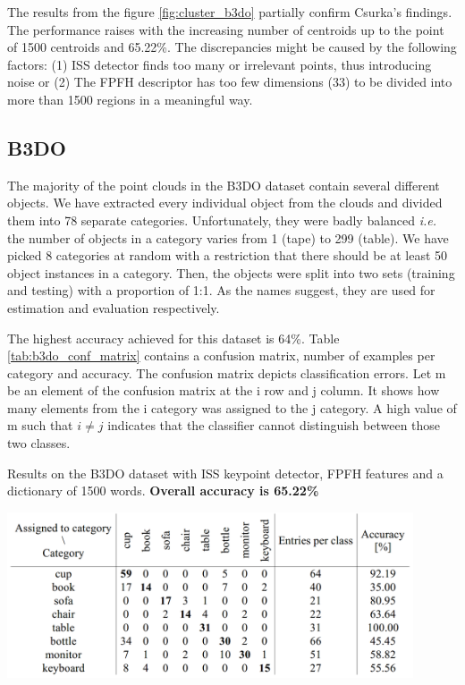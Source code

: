 	The results from the figure \ref{fig:cluster_b3do} partially confirm Csurka's findings. The performance raises with the increasing number of centroids up to the point of 1500 centroids and 65.22\%. The discrepancies might be caused by the following factors: (1) ISS detector finds too many or irrelevant points, thus introducing noise or (2) The FPFH descriptor has too few dimensions (33) to be divided into more than 1500 regions in a meaningful way. 

	
	\subsection{B3DO}
	The majority of the point clouds in the B3DO dataset contain several different objects. We have extracted every individual object from the clouds and divided them into 78 separate categories. Unfortunately, they were badly balanced \emph{i.e.} the number of objects in a category varies from 1 (tape) to 299 (table). We have picked 8 categories at random with a restriction that there should be at least 50 object instances in a category. Then, the objects were split into two sets (training and testing) with a proportion of 1:1. As the names suggest, they are used for estimation and evaluation respectively.
	
	The highest accuracy achieved for this dataset is 64\%. Table \ref{tab:b3do_conf_matrix} contains a confusion matrix, number of examples per category and accuracy. The confusion matrix depicts classification errors. Let m be an element of the confusion matrix at the i row and j column. It shows how many elements from the i category was assigned to the j category. A high value of m such that $i \neq j$ indicates that the classifier cannot distinguish between those two classes.
	
	\begin{table}[!ht]
	\centering
	\caption{Results on the B3DO dataset with ISS keypoint detector, FPFH features and a dictionary of 1500 words. \textbf{Overall accuracy is 65.22\%}}
	\includegraphics[width=0.9\textwidth]{figs/b3do_conf_matrix}	
	\label{tab:b3do_conf_matrix}
	\end{table}
	
